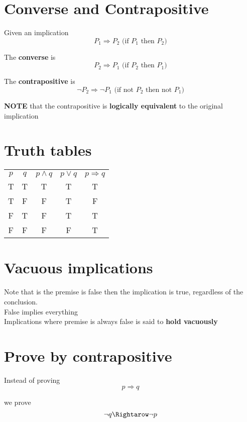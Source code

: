 \section{Converse and Contrapositive}

Given an implication
\[
   P_1 \Rightarrow P_2 \text{ (if $P_1$ then $P_2$)}
\] 

The \textbf{converse} is
\[
  P_2 \Rightarrow P_1 \text{ (if $P_2$ then $P_1$)}
\] 

The \textbf{contrapositive} is 
\[
  \lnot P_2 \Rightarrow \lnot P_1 \text{ (if not $P_2$ then not $P_1$)}
\] 

\textbf{NOTE} that the contrapositive is \textbf{logically equivalent} to the original implication

\section{Truth tables}

\begin{center}
   \begin{tabular}{| c | c | c | c | c |}
      $p$ & $q$ & $p \land q$ & $p \lor q$ & $p \Rightarrow q$ \\
      T & T & T & T & T \\
      T & F & F & T & F \\
      F & T & F & T & T \\
      F & F & F & F & T
   \end{tabular}
\end{center}


\section{Vacuous implications}

Note that is the premise is false then the implication is true, regardless of the conclusion. \\ 

False implies everything \\

Implications where premise is always false is said to \textbf{hold vacuously}

\section{Prove by contrapositive}

Instead of proving 
 \[
  p \Rightarrow q
\] 

we prove
\[
  \lnot q \Rightarow \lnot p
\] 

